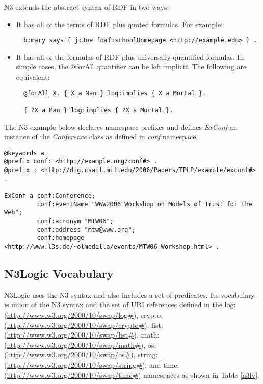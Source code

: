\documentclass{tlp}
\begin{document}
N3 extends the abstract syntax of RDF in two ways:

\begin{itemize}

\item{}It has all of the terms of RDF plus quoted formulas. For
  example:

\begin{verbatim}
  b:mary says { j:Joe foaf:schoolHomepage <http://example.edu> } .
\end{verbatim}

\item{}It has all of the formulas of RDF plus universally quantified
  formulas. In simple cases, the @forAll quantifier can be left
  implicit. The following are equivalent:

\begin{verbatim}
  @forAll X. { X a Man } log:implies { X a Mortal }.

  { ?X a Man } log:implies { ?X a Mortal }.
\end{verbatim}

\end{itemize}

The N3 example below declares namespace prefixes and defines {\it
  ExConf} an instance of the {\it Conference} class as defined in {\it
  conf} namespace.

\begin{verbatim}
@keywords a.
@prefix conf: <http://example.org/conf#> .
@prefix : <http://dig.csail.mit.edu/2006/Papers/TPLP/example/exconf#> .

ExConf a conf:Conference;
         conf:eventName "WWW2006 Workshop on Models of Trust for the Web";
         conf:acronym "MTW06";
         conf:address "mtw@www.org";
         conf:homepage <http://www.l3s.de/~olmedilla/events/MTW06_Workshop.html> .
\end{verbatim}


\subsection{N3Logic Vocabulary}
\label{builtin}

N3Logic uses the N3 syntax and also includes a set of predicates. Its
vocabulary is union of the N3 syntax and the set of URI references
defined in the log: (\url{http://www.w3.org/2000/10/swap/log#}),
crypto: (\url{http://www.w3.org/2000/10/swap/crypto#}), list:
(\url{http://www.w3.org/2000/10/swap/list#}), math:
(\url{http://www.w3.org/2000/10/swap/math#}), os:
(\url{http://www.w3.org/2000/10/swap/os#}), string:
(\url{http://www.w3.org/2000/10/swap/string#}), and time:
(\url{http://www.w3.org/2000/10/swap/time#}) namespaces as shown in
Table \ref{n3lv}.
\end{document}
